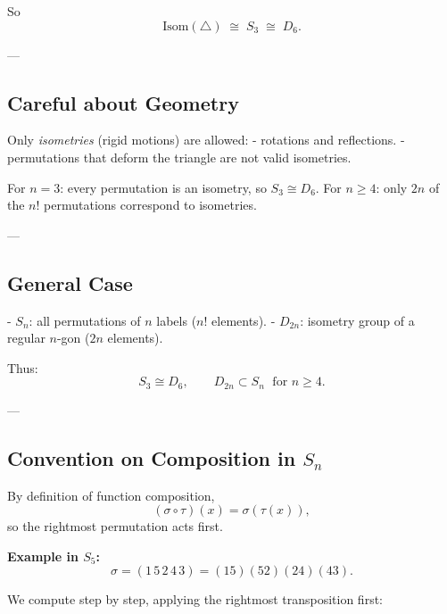 \documentclass[12pt]{article}
\begin{document}
	So
	$$
	\mathrm{Isom}(\triangle) \;\cong\; S_3 \;\cong\; D_6.
	$$
	
	---
	
	\subsection*{Careful about Geometry}
	Only \emph{isometries} (rigid motions) are allowed:
	- rotations and reflections.  
	- permutations that deform the triangle are not valid isometries.  
	
	For $n=3$: every permutation is an isometry, so $S_3 \cong D_6$.  
	For $n \geq 4$: only $2n$ of the $n!$ permutations correspond to isometries.
	
	---
	
	\subsection*{General Case}
	- $S_n$: all permutations of $n$ labels ($n!$ elements).  
	- $D_{2n}$: isometry group of a regular $n$-gon ($2n$ elements).  
	
	Thus:
	$$
	S_3 \cong D_6, \qquad
	D_{2n} \subset S_n \;\text{ for } n \geq 4.
	$$
	
	---
	
	\subsection*{Convention on Composition in $S_n$}
	
	By definition of function composition,
	$$
	(\sigma \circ \tau)(x) = \sigma(\tau(x)),
	$$
	so the rightmost permutation acts first.
	
	\medskip
	
	\noindent\textbf{Example in $S_5$:}
	\[
	\sigma = (1\,5\,2\,4\,3) = (15)(52)(24)(43).
	\]
	
	We compute step by step, applying the rightmost transposition first:
	
\end{document}
